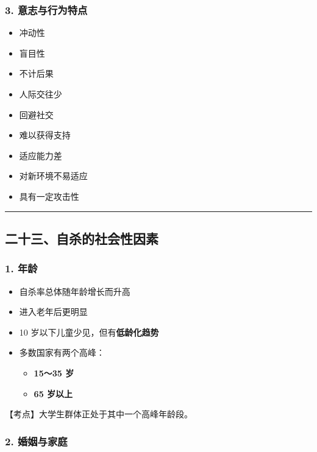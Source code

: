 \documentclass[
  chinese,
  9pt,
  a4paper,
]{ctexart}
\providecommand{\tightlist}{%
  \setlength{\itemsep}{0pt}\setlength{\parskip}{0pt}}
\begin{document}
\subsubsection{3.
意志与行为特点}\label{ux610fux5fd7ux4e0eux884cux4e3aux7279ux70b9}

\begin{itemize}
\tightlist
\item
  冲动性
\item
  盲目性
\item
  不计后果
\item
  人际交往少
\item
  回避社交
\item
  难以获得支持
\item
  适应能力差
\item
  对新环境不易适应
\item
  具有一定攻击性
\end{itemize}

\begin{center}\rule{0.5\linewidth}{0.5pt}\end{center}

\subsection{二十三、自杀的社会性因素}\label{ux4e8cux5341ux4e09ux81eaux6740ux7684ux793eux4f1aux6027ux56e0ux7d20}

\subsubsection{1. 年龄}\label{ux5e74ux9f84}

\begin{itemize}
\item
  自杀率总体随年龄增长而升高
\item
  进入老年后更明显
\item
  10 岁以下儿童少见，但有\textbf{低龄化趋势}
\item
  多数国家有两个高峰：

  \begin{itemize}
  \tightlist
  \item
    \textbf{15～35 岁}
  \item
    \textbf{65 岁以上}
  \end{itemize}
\end{itemize}

【考点】大学生群体正处于其中一个高峰年龄段。

\subsubsection{2. 婚姻与家庭}\label{ux5a5aux59fbux4e0eux5bb6ux5ead}
\end{document}
